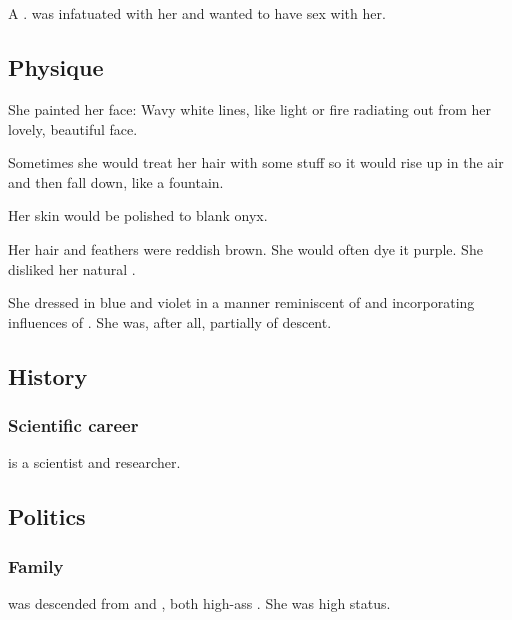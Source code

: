 \section[Firaxel]{\Firaxel}
\index{\Firaxel}
A \ketheran{} \resvil. 
\Teshrial{} was infatuated with her and wanted to have sex with her. 









\subsection{Physique}
She painted her face: 
Wavy white lines, like light or fire radiating out from her lovely, beautiful face. 

Sometimes she would treat her hair with some stuff so it would rise up in the air and then fall down, like a fountain. 

Her skin would be polished to blank onyx. 

Her hair and feathers were reddish brown.
She would often dye it purple. 
She disliked her natural \colour. 

She dressed in blue and violet in a manner reminiscent of and incorporating influences of \TiphredSerah. 
She was, after all, partially of \TiphredSerah{} descent. 









\subsection{History}





\subsubsection{Scientific career}
\Firaxel{} is a scientist and researcher. 









\subsection{Politics}
\subsubsection{Family}
\Firaxel{} was descended from  and , both high-ass \ketherain.
She was high status. 















